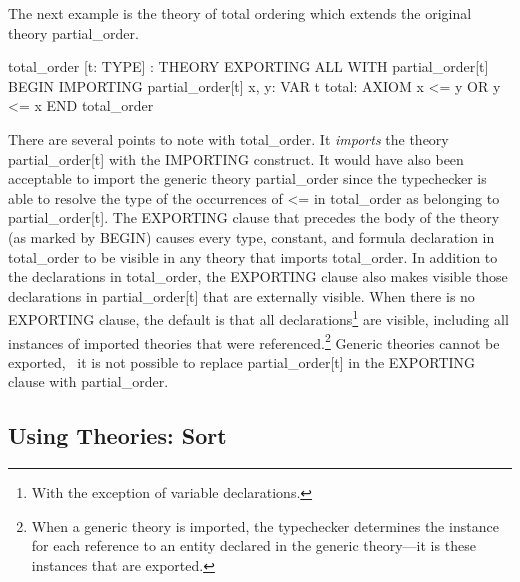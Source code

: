 The next example is the theory of total ordering which extends the
original theory {\stt partial\_order}.
\begin{pvsexample}
  total_order [t: TYPE] : THEORY
   EXPORTING ALL WITH partial_order[t]
   BEGIN
    IMPORTING partial_order[t]
    x, y: VAR t
    total: AXIOM  x <= y OR y <= x
   END total_order
\end{pvsexample}
%
There are several points to note with {\stt total\_order}.  It {\em
imports\/} the theory {\stt partial\_order[t]} with the {\stt
IMPORTING} construct.  It would have also been acceptable to import
the generic theory {\stt partial\_order} since the typechecker is able
to resolve the type of the occurrences of {\stt <=} in {\stt
total\_order} as belonging to {\stt partial\_order[t]}.  The {\stt
EXPORTING} clause that precedes the body of the theory (as marked by
{\stt BEGIN}) causes every type, constant, and formula declaration in
{\stt total\_order} to be visible in any theory that imports {\stt
total\_order}.  In addition to the declarations in {\stt
total\_order}, the {\stt EXPORTING} clause also makes visible those
declarations in {\stt partial\_order[t]} that are externally visible.
When there is no {\stt EXPORTING} clause, the default is that all
declarations\footnote{With the exception of variable declarations.}
are visible, including all instances of imported theories that were
referenced.\footnote{When a generic theory is imported, the
typechecker determines the instance for each reference to an
entity declared in the generic theory---it is these instances that are
exported.} Generic theories cannot be exported, \ie\ it is not
possible to replace {\stt partial\_order[t]} in the {\stt EXPORTING}
clause with {\stt partial\_order}.


\subsection{Using Theories: Sort}

